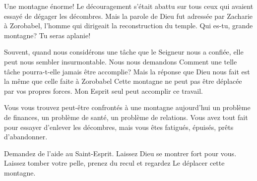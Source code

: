 Une montagne énorme! Le découragement s'était abattu sur tous ceux
 qui avaient essayé de dégager les décombres. Mais la parole de Dieu
 fut adressée par Zacharie à Zorobabel, l'homme qui dirigeait
 la reconstruction du temple.
 \Og Qui es-tu, grande montagne? Tu seras aplanie! \Fg{}

Souvent, quand nous considérons une tâche que le Seigneur nous a confiée,
 elle peut nous sembler insurmontable. Nous nous demandons\frcolon{} 
 \Og Comment une telle tâche pourra-t-elle jamais être accomplie? \Fg{}
 Mais la réponse que Dieu nous fait est la même que celle faite à Zorobabel\frcolon{}
 \Og Cette montagne ne peut pas être déplacée par vos propres forces.
 Mon Esprit seul peut accomplir ce travail. \Fg{}

Vous vous trouvez peut-être confrontés à une montagne aujourd'hui
 \ocadr un problème de finances, un problème de santé,
 un problème de relations. Vous avez tout fait pour essayer
 d'enlever les décombres, mais vous êtes fatigués, épuisés, prêts d'abandonner. 


Demandez de l'aide au Saint-Esprit. Laissez Dieu se montrer fort pour vous.
 Laissez tomber votre pelle, prenez du recul et regardez
 Le déplacer cette montagne. 

\dvrule



